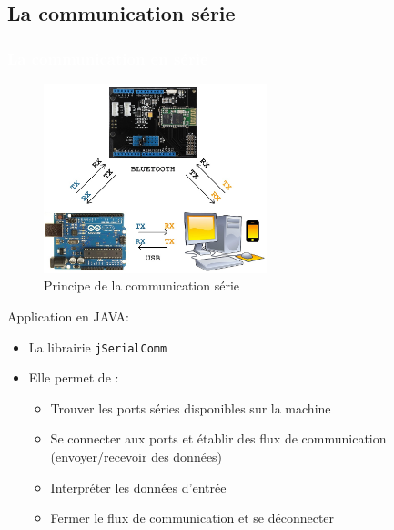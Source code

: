 \documentclass{beamer}
\begin{document}
\subsection{La communication série}
\begin{frame}
\frametitle{\textcolor{white}{La communication en série}}

\begin{figure}
\includegraphics[height=5.5cm]{images/rxtx.png}
\caption{Principe de la communication série}
\end{figure}
\end{frame}

\begin{frame}
Application en JAVA:
\begin{itemize}
\item La librairie \texttt{jSerialComm}
\item Elle permet de :
\begin{itemize}
\item Trouver les ports séries disponibles sur la machine
\item Se connecter aux ports et établir des flux de communication (envoyer/recevoir des données)
\item Interpréter les données d'entrée
\item Fermer le flux de communication et se déconnecter
\end{itemize}
\end{itemize}
\end{frame}
\end{document}

